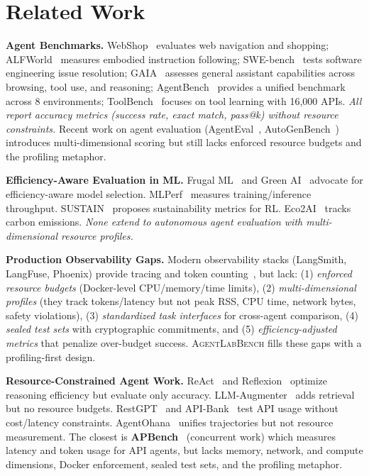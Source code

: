 \documentclass[letterpaper, 10 pt, conference]{ieeeconf}
\newcommand{\agentslabench}{\textsc{AgentLabBench}}
\begin{document}
\section{Related Work}
\label{sec:related}

\textbf{Agent Benchmarks.} WebShop~\cite{yao2022webshop} evaluates web navigation and shopping; ALFWorld~\cite{shridhar2020alfworld} measures embodied instruction following; SWE-bench~\cite{jimenez2023swebench} tests software engineering issue resolution; GAIA~\cite{mialon2023gaia} assesses general assistant capabilities across browsing, tool use, and reasoning; AgentBench~\cite{liu2023agentbench} provides a unified benchmark across 8 environments; ToolBench~\cite{xu2023toolbench} focuses on tool learning with 16,000 APIs. \textit{All report accuracy metrics (success rate, exact match, pass@k) without resource constraints.} Recent work on agent evaluation (AgentEval~\cite{li2023agenteval}, AutoGenBench~\cite{wu2023autogenbench}) introduces multi-dimensional scoring but still lacks enforced resource budgets and the profiling metaphor.

\textbf{Efficiency-Aware Evaluation in ML.} Frugal ML~\cite{lin2023frugal} and Green AI~\cite{schwartz2020green} advocate for efficiency-aware model selection. MLPerf~\cite{mattson2020mlperf} measures training/inference throughput. SUSTAIN~\cite{henderson2020towards} proposes sustainability metrics for RL. Eco2AI~\cite{budennyy2022eco2ai} tracks carbon emissions. \textit{None extend to autonomous agent evaluation with multi-dimensional resource profiles.}

\textbf{Production Observability Gaps.} Modern observability stacks (LangSmith, LangFuse, Phoenix) provide tracing and token counting~\cite{langsmith2024production, langfuse2024}, but lack: (1) \textit{enforced resource budgets} (Docker-level CPU/memory/time limits), (2) \textit{multi-dimensional profiles} (they track tokens/latency but not peak RSS, CPU time, network bytes, safety violations), (3) \textit{standardized task interfaces} for cross-agent comparison, (4) \textit{sealed test sets} with cryptographic commitments, and (5) \textit{efficiency-adjusted metrics} that penalize over-budget success. \agentslabench{} fills these gaps with a profiling-first design.

\textbf{Resource-Constrained Agent Work.} ReAct~\cite{yao2022react} and Reflexion~\cite{shinn2023reflexion} optimize reasoning efficiency but evaluate only accuracy. LLM-Augmenter~\cite{peng2023llm} adds retrieval but no resource budgets. RestGPT~\cite{song2023restgpt} and API-Bank~\cite{li2023apibank} test API usage without cost/latency constraints. AgentOhana~\cite{zeng2023agentohana} unifies trajectories but not resource measurement. The closest is \textbf{APBench}~\cite{chen2024apbench} (concurrent work) which measures latency and token usage for API agents, but lacks memory, network, and compute dimensions, Docker enforcement, sealed test sets, and the profiling metaphor.
\end{document}
